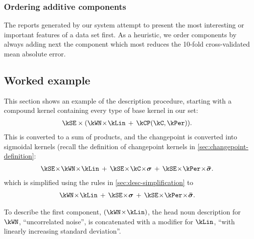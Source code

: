 

\subsubsection{Ordering additive components}

The reports generated by our system attempt to present the most interesting or important features of a data set first.
As a heuristic, we order components by always adding next the component which most reduces the 10-fold cross-validated mean absolute error.



\subsection{Worked example}

This section shows an example of the description procedure, starting with a compound kernel containing every type of base kernel in our set:
%
\begin{align}
\kSE \times (\kWN \kerntimes \kLin \kernplus \kCP(\kC, \kPer)).
\end{align}
%
This is converted to a sum of products, and the changepoint is converted into sigmoidal kernels (recall the definition of changepoint kernels in \cref{sec:changepoint-definition}:
%
\begin{align}
\kSE \kerntimes \kWN \kerntimes \kLin \kernplus 
\kSE \kerntimes \kC \kerntimes \boldsymbol{\sigma} \kernplus 
\kSE \kerntimes \kPer \kerntimes \boldsymbol{\bar\sigma}.
\end{align}
%
which is simplified using the rules in \cref{sec:desc-simplification} to
%
\begin{align}
\kWN \kerntimes \kLin \kernplus 
\kSE \kerntimes \boldsymbol{\sigma} \kernplus 
\kSE \kerntimes \kPer \kerntimes \boldsymbol{\bar\sigma}.
\end{align}

To describe the first component, $(\kWN \kerntimes \kLin)$, the head noun description for $\kWN$, ``uncorrelated noise'', is concatenated with a modifier for $\kLin$, ``with linearly increasing standard deviation''.

